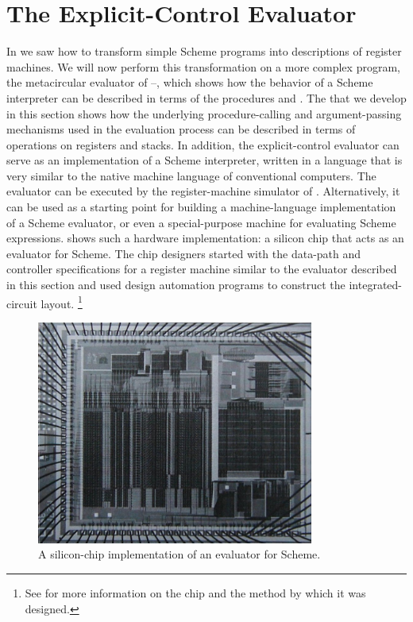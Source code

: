 \section{The Explicit-Control Evaluator}
\label{Section 5.4}

In  we saw how to transform simple Scheme programs into descriptions of register machines.
We will now perform this transformation on a more complex program, the metacircular evaluator of --, which shows how the behavior of a Scheme interpreter can be described in terms of the procedures  and .
The  that we develop in this section shows how the underlying procedure-calling and argument-passing mechanisms used in the evaluation process can be described in terms of operations on registers and stacks.
In addition, the explicit-control evaluator can serve as an implementation of a Scheme interpreter, written in a language that is very similar to the native machine language of conventional computers.
The evaluator can be executed by the register-machine simulator of .
Alternatively, it can be used as a starting point for building a machine-language implementation of a Scheme evaluator, or even a special-purpose machine for evaluating Scheme expressions.
 shows such a hardware implementation:
a silicon chip that acts as an evaluator for Scheme.
The chip designers started with the data-path and controller specifications for a register machine similar to the evaluator described in this section and used design automation programs to construct the integrated-circuit layout.%
\footnote{
	See  for more information on the chip and the method by which it was designed.
}

\begin{figure}[tb]
	\centering
	\includegraphics[width=91mm]{fig/chap5/chip.jpg}
	\caption{
		A silicon-chip implementation of an evaluator for Scheme.
	}
	\label{Figure 5.16}
\end{figure}



